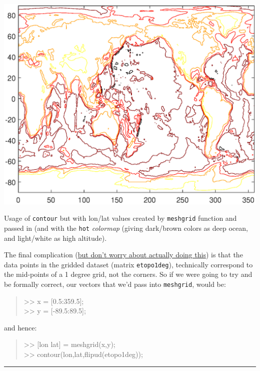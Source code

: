 \documentclass{tufte-book} %
\newenvironment{docspec}{\begin{quotation}\ttfamily\parskip0pt\parindent0pt\ignorespaces}{\end{quotation}}
\begin{document}
\begin{marginfigure}[0.0in]
\includegraphics[width=\linewidth]{ch5-contour5.eps}
\caption{Usage of \texttt{contour} but with lon/lat values created by \texttt{meshgrid} function and passed in (and with the \texttt{hot} \textit{colormap} (giving dark/brown colors as deep ocean, and light/white as high altitude).}
\label{fig:ch5-contour5}
\end{marginfigure}

The final complication (\uline{but don't worry about actually doing this}) is that the data points in the gridded dataset (matrix \texttt{etopo1deg}), technically correspond to the mid-points of a 1 degree grid, not the corners. So if we were going to try and be formally correct, our vectors that we'd pass into \texttt{meshgrid}, would be:
\begin{docspec}
>> x = [0.5:359.5];
\\ >> y = [-89.5:89.5];
\end{docspec}
and hence:
\begin{docspec}
>> [lon lat] = meshgrid(x,y);\\
>> contour(lon,lat,flipud(etopo1deg));
\end{docspec}


\vspace{1mm}
\noindent\rule{4cm}{0.5pt}
\vspace{-2mm}
\end{document}
